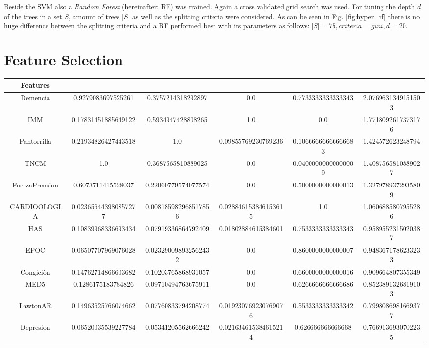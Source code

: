 \documentclass[11pt]{article}
\begin{document}
Beside the SVM also a \emph{Random Forest} (hereinafter: RF) was trained. Again a cross validated grid search was used. For tuning the depth $d$ of the trees in a set $S$, amount of trees $|S|$ as well as the splitting criteria were considered. As can be seen in Fig. \ref{fig:hyper_rf} there is no huge difference between the splitting criteria and a RF performed best with its parameters as follows: $|S|= 75, criteria = gini, d=20$.



\section{Feature Selection}
\begin{table}
\centering
\scriptsize
\begin{tabular}{|c|SSSSS|}
\hline
Features &  &  &  &  &  \\ \hline
Demencia & 0.9279083697525261 & 0.3757214318292897 & 0.0 & 0.7733333333333343 & 2.0769631349151503\\ 
IMM & 0.17831451885649122 & 0.5934947428808265 &1.0& 0.0 & 1.7718092617373176\\ 
Pantorrilla & 0.21934826427443518 & 1.0 & 0.09855769230769236 & 0.10666666666666683 & 1.424572623248794\\ 
TNCM& 1.0 & 0.3687565810889025 & 0.0 & 0.04000000000000009 & 1.4087565810889027\\ 
FuerzaPrension & 0.6073711415528037 & 0.22060779574077574 & 0.0 & 0.5000000000000013 & 1.3279789372935809\\
CARDIOOLOGIA & 0.023656443980857277 & 0.008185982968517856 & 0.028846153846153615 & 1.0 & 1.0606885807955286\\
HAS & 0.10839968336693434 & 0.07919336864792409 & 0.01802884615384601 & 0.7533333333333343 & 0.9589552315020387\\
EPOC &0.06507707969076028  & 0.023290098932562432 & 0.0 & 0.8600000000000007 & 0.9483671786233233\\
Congiciòn & 0.14762714866603682 & 0.10203765868931057 & 0.0 & 0.6600000000000016 &  0.909664807355349\\ 
MED5 & 0.1286175183784826 & 0.09710494763675911 & 0.0 & 0.6266666666666686 & 0.8523891326819103\\ 
LawtonAR & 0.14963625766074662 & 0.07760833794208774 & 0.019230769230769076 & 0.5533333333333342 & 0.7998086981669377\\ 
Depresion & 0.06520035539227784 & 0.05341205562666242 & 0.021634615384615214 & 0.626666666666668 & 0.7669136930702235\\

\end{tabular}
\end{table}
\end{document}
